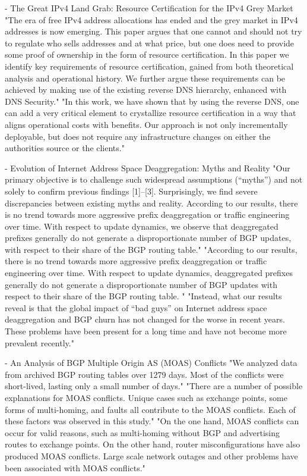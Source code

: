 \documentclass[11pt,a4paper]{scrreprt}
\begin{document}
- The Great IPv4 Land Grab: Resource Certification for the IPv4 Grey Market
"The era of free IPv4 address allocations has ended and the grey market in IPv4 addresses is now emerging. This paper argues that one cannot and should not try to regulate who sells addresses and at what price, but one does need to provide some proof of ownership in the form of resource certification. In this paper we identify key requirements of resource certification, gained from both theoretical analysis and operational history. We further argue these requirements can be achieved by making use of the existing reverse DNS
hierarchy, enhanced with DNS Security." 
"In this work, we have shown that by using the reverse DNS, one can add a very critical element to crystallize resource certification in a way that aligns operational costs with benefits. Our approach is not only incrementally deployable, but does not require any infrastructure changes on either the authorities source or the clients."


- Evolution of Internet Address Space Deaggregation: Myths and Reality
"Our primary objective is to challenge such widespread assumptions (“myths”) and not solely to confirm previous findings [1]–[3]. Surprisingly, we find severe discrepancies between existing myths and reality. According to our results, there is no trend towards more aggressive prefix deaggregation or traffic engineering over time. With respect to update dynamics, we observe that deaggregated prefixes generally do not generate a disproportionate number of BGP updates, with respect to their share of the BGP routing table."
"According to our results, there is no trend towards more aggressive prefix deaggregation or traffic engineering over time. With respect to update dynamics, deaggregated prefixes generally do not generate a
disproportionate number of BGP updates with respect to their share of the BGP routing table. "
"Instead, what our results reveal is that the global impact of “bad guys” on Internet address space deaggregation and BGP churn has not changed for the worse in recent years. These problems have been present for a long time and have not become more prevalent recently."


- An Analysis of BGP Multiple Origin AS (MOAS) Conflicts
"We analyzed data from archived BGP routing tables over 1279 days. Most of the conflicts
were short-lived, lasting only a small number of days."
"There are a number of possible explanations for MOAS conflicts. Unique cases such as exchange points, some
forms of multi-homing, and faults all contribute to the MOAS conflicts. Each of these factors was observed in this study."
"On the one hand, MOAS conflicts can occur for valid reasons, such as multi-homing without BGP and advertising routes to exchange points. On the other hand, router misconfigurations have also produced MOAS conflicts. Large scale network outages and other problems have been associated with MOAS conflicts." 
\end{document}
